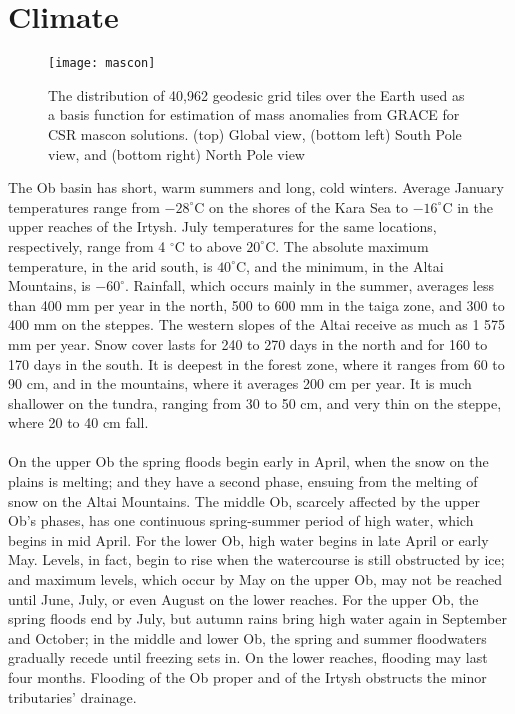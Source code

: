 \section{Climate}
\begin{figure}[htbp]
	\centering
	\texttt{[image: mascon]} %
	\caption{The distribution of 40,962 geodesic grid tiles over the Earth used as a basis function for estimation of mass
		anomalies from GRACE for CSR mascon solutions. (top) Global view, (bottom left) South Pole view, and (bottom right) North Pole view \cite{save2016high}} 
	\label{fig:mascon}
\end{figure}
The Ob basin has short, warm summers and long, cold winters. Average January temperatures range from  $-28 ^{\circ}$C on the shores of the Kara Sea to $-16 ^{\circ}$C in the upper reaches of the Irtysh. July temperatures for the same locations, respectively, range from 4 $^{\circ}$C to above $20 ^{\circ}$C. The absolute maximum temperature, in the arid south, is $40 ^{\circ}$C,\cite{Obriver} and the minimum, in the Altai Mountains, is $-60 ^{\circ}$. Rainfall, which occurs mainly in the summer, averages less than 400 mm per year in the north, 500 to 600 mm in the taiga zone, and 300 to 400 mm on the steppes. The western slopes of the Altai receive as much as 1 575 mm per year. Snow cover lasts for 240 to 270 days in the north and for 160 to 170 days in the south. It is deepest in the forest zone, where it ranges from 60 to 90 cm, and in the mountains, where it averages 200 cm per year. It is much shallower on the tundra, ranging from 30 to 50 cm, and very thin on the steppe, where 20 to 40 cm fall.\cite{Obriver}\\\\
On the upper Ob the spring floods begin early in April, when the snow on the plains is melting; and they have a second phase, ensuing from the melting of snow on the Altai Mountains. The middle Ob, scarcely affected by the upper Ob's phases, has one continuous spring-summer period of high water, which begins in mid April. For the lower Ob, high water begins in late April or early May. Levels, in fact, begin to rise when the watercourse is still obstructed by ice; and maximum levels, which occur by May on the upper Ob, may not be reached until June, July, or even August on the lower reaches. For the upper Ob, the spring floods end by July, but autumn rains bring high water again in September and October; in the middle and lower Ob, the spring and summer floodwaters gradually recede until freezing sets in. On the lower reaches, flooding may last four months. Flooding of the Ob proper and of the Irtysh obstructs the minor tributaries' drainage.
